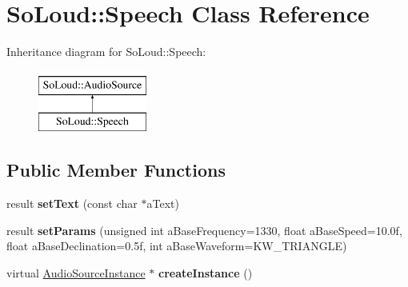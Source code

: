 \hypertarget{class_so_loud_1_1_speech}{}\section{So\+Loud\+::Speech Class Reference}
\label{class_so_loud_1_1_speech}
Inheritance diagram for So\+Loud\+::Speech\+:\begin{figure}[H]
\begin{center}
\leavevmode
\includegraphics[height=2.000000cm]{class_so_loud_1_1_speech}
\end{center}
\end{figure}
\subsection*{Public Member Functions}
\begin{DoxyCompactItemize}
\item 
\mbox{\label{class_so_loud_1_1_speech_a3c7ca61fa3aa9ce1d665b3fcc05dcfb4}} 
result {\bfseries set\+Text} (const char $\ast$a\+Text)
\item 
\mbox{\label{class_so_loud_1_1_speech_ade55c6c13156fff15668bd3934c004db}} 
result {\bfseries set\+Params} (unsigned int a\+Base\+Frequency=1330, float a\+Base\+Speed=10.\+0f, float a\+Base\+Declination=0.\+5f, int a\+Base\+Waveform=\+K\+W\+\_\+\+T\+R\+I\+A\+N\+G\+L\+E)
\item 
\mbox{\label{class_so_loud_1_1_speech_a31c1e953ed39d4df3108e9287188d250}} 
virtual \mbox{\hyperlink{class_so_loud_1_1_audio_source_instance}{Audio\+Source\+Instance}} $\ast$ {\bfseries create\+Instance} ()
\end{DoxyCompactItemize}
